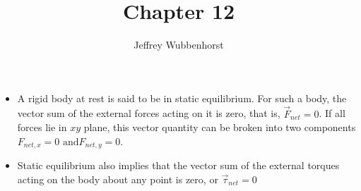 \documentclass[10pt,letterpaper]{article}
\author{Jeffrey Wubbenhorst}
\title{Chapter 12}
\begin{document}
\maketitle

\begin{itemize}
\item A rigid body at rest is said to be in static equilibrium. For such a body, the vector sum of the external forces acting on it is zero, that is, $\vec{F}_{net}=0$. If all forces lie in $xy$ plane, this vector quantity can be broken into two components $F_{net,x}=0\mbox{ and} F_{net,y}=0$. 
\item Static equilibrium also implies that the vector sum of the external torques acting on the body about any point is zero, or $\vec{\tau}_{net}=0$



\end{itemize}
\end{document}
